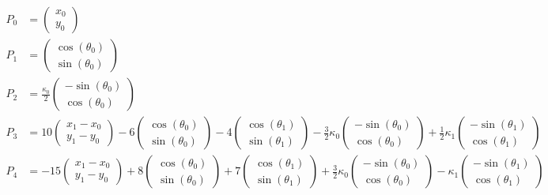 \documentclass {article}
\begin{document}
\begin {align*}
P_0 &= \left(\begin{array}{c}x_0\\y_0\end{array}\right) \\
P_1 &= \left(\begin{array}{c}\cos(\theta_0)\\ \sin(\theta_0)\end{array}\right) \\
P_2 &= \frac{\kappa_0}{2} \left(\begin{array}{c}-\sin (\theta_0)\\ \cos (\theta_0)\end{array}\right) \\
P_3 &= 10 \left(\begin{array}{c}x_1-x_0\\y_1-y_0\end{array}\right) -6 \left(\begin{array}{c}\cos(\theta_0)\\\sin(\theta_0)\end{array}\right) -4 \left(\begin{array}{c}\cos(\theta_1)\\\sin(\theta_1)\end{array}\right) -\frac{3}{2} \kappa_0\left(\begin{array}{c}-\sin(\theta_0)\\\cos(\theta_0)\end{array}\right) + \frac {1}{2}\kappa_1\left(\begin{array}{c}-\sin(\theta_1)\\\cos(\theta_1)\end{array}\right)\\
P_4 &= -15 \left(\begin{array}{c}x_1-x_0\\y_1-y_0\end{array}\right) +8 \left(\begin{array}{c}\cos(\theta_0)\\\sin(\theta_0)\end{array}\right) +7 \left(\begin{array}{c}\cos(\theta_1)\\\sin(\theta_1)\end{array}\right) +\frac{3}{2} \kappa_0\left(\begin{array}{c}-\sin(\theta_0)\\\cos(\theta_0)\end{array}\right)  - \kappa_1\left(\begin{array}{c}-\sin(\theta_1)\\\cos(\theta_1)\end{array}\right)\\

\end{align*}
\end{document}

